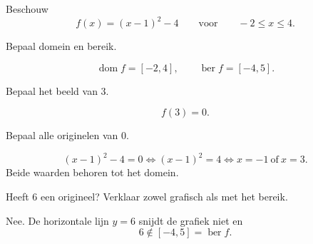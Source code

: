 \documentclass{ximera}
\begin{document}
\begin{oefening}{\oefU\ESS}

Beschouw
\[
f(x)=(x-1)^2-4
\qquad\text{voor}\qquad -2\leq x\leq4.
\]

\begin{center}
\end{center}

\begin{question}
Bepaal domein en bereik.

\begin{oplossing}
\[
\operatorname{dom}f=[-2,4],
\qquad
\operatorname{ber}f=[-4,5].
\]
\end{oplossing}
\end{question}

\begin{question}
Bepaal het beeld van \(3\).

\begin{oplossing}
\[
f(3)=0.
\]
\end{oplossing}
\end{question}

\begin{question}
Bepaal alle originelen van \(0\).

\begin{oplossing}
\[
(x-1)^2-4=0
\Longleftrightarrow
(x-1)^2=4
\Longleftrightarrow
x=-1\ \text{of}\ x=3.
\]
Beide waarden behoren tot het domein.
\end{oplossing}
\end{question}

\begin{question}
Heeft \(6\) een origineel? Verklaar zowel grafisch als met het bereik.

\begin{oplossing}
Nee. De horizontale lijn \(y=6\) snijdt de grafiek niet en
\[
6\notin[-4,5]=\operatorname{ber}f.
\]
\end{oplossing}
\end{question}

\end{oefening}
\end{document}
